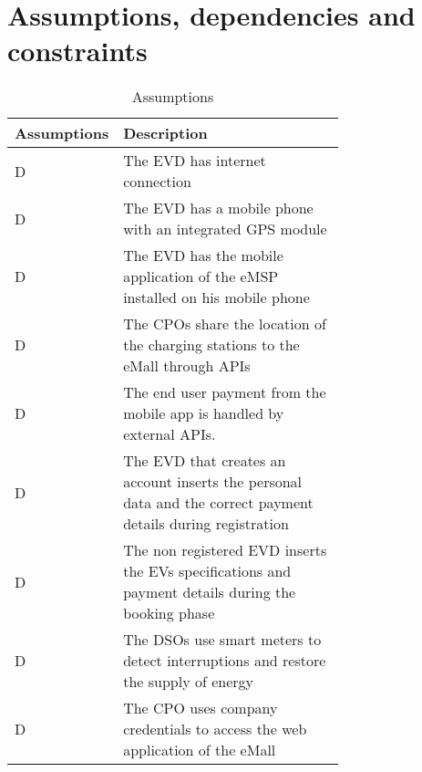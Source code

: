 \section{Assumptions, dependencies and constraints}
\label{sec:Assumptions, dependencies and constraints}%
\setcounter{ac}{1}
\newcommand{\acount}{\theac\stepcounter{ac}}
\begin{table}[h!]
    \centering
    \begin{tabular}{|l|p{0.725\linewidth}|}
     \hline
     \textbf{Assumptions} & \textbf{Description} \\
     \hline
     D\acount & The EVD has internet connection \\
     \hline
     D\acount & The EVD has a mobile phone with an integrated GPS module \\
     \hline
     D\acount & The EVD has the mobile application of the eMSP installed on his mobile phone \\
     \hline
     D\acount & The CPOs share the location of the charging stations to the eMall through APIs\\
     \hline
     D\acount & The end user payment from the mobile app is handled by external APIs.\\
     \hline
     D\acount & The EVD that creates an account inserts the personal data and the correct payment details during registration \\
     \hline
     D\acount & The non registered EVD inserts the EVs specifications and payment details during the booking phase \\
     \hline
     D\acount & The DSOs use smart meters to detect interruptions and restore the supply of energy \\
     \hline
     D\acount & The CPO uses company credentials to access the web application of the eMall \\
     \hline
\end{tabular}
    \caption{Assumptions}
    \label{tab:Assumptions}
\end{table}